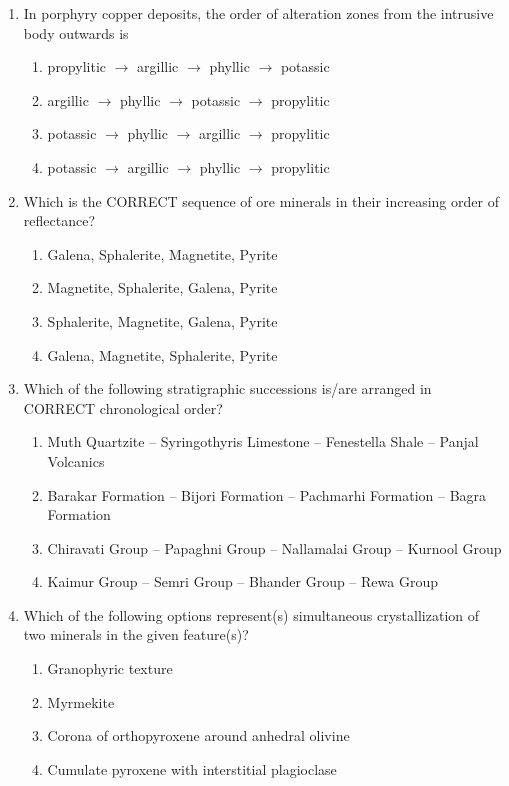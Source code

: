 \documentclass[journal,12pt,onecolumn]{IEEEtran}
\theoremstyle{remark}
\begin{document}
\begin{enumerate}
\item In porphyry copper deposits, the order of alteration zones from the intrusive body outwards is
\begin{enumerate}
\item propylitic $\rightarrow$ argillic $\rightarrow$ phyllic $\rightarrow$ potassic
\item argillic $\rightarrow$ phyllic $\rightarrow$ potassic $\rightarrow$ propylitic
\item potassic $\rightarrow$ phyllic $\rightarrow$ argillic $\rightarrow$ propylitic
\item potassic $\rightarrow$ argillic $\rightarrow$ phyllic $\rightarrow$ propylitic
\end{enumerate}
\vspace{0.5cm}

\item Which is the CORRECT sequence of ore minerals in their increasing order of reflectance?
\begin{enumerate}
\item Galena, Sphalerite, Magnetite, Pyrite
\item Magnetite, Sphalerite, Galena, Pyrite
\item Sphalerite, Magnetite, Galena, Pyrite
\item Galena, Magnetite, Sphalerite, Pyrite
\end{enumerate}
\vspace{0.5cm}


\item Which of the following stratigraphic successions is/are arranged in CORRECT chronological order?
\begin{enumerate}
\item Muth Quartzite -- Syringothyris Limestone -- Fenestella Shale -- Panjal Volcanics
\item Barakar Formation -- Bijori Formation -- Pachmarhi Formation -- Bagra Formation
\item Chiravati Group -- Papaghni Group -- Nallamalai Group -- Kurnool Group
\item Kaimur Group -- Semri Group -- Bhander Group -- Rewa Group
\end{enumerate}
\vspace{0.5cm}

\item Which of the following options represent(s) simultaneous crystallization of two minerals in the given feature(s)?
\begin{enumerate}
\item Granophyric texture
\item Myrmekite
\item Corona of orthopyroxene around anhedral olivine
\item Cumulate pyroxene with interstitial plagioclase
\end{enumerate}
\vspace{0.5cm}


\end{enumerate}
\end{document}
